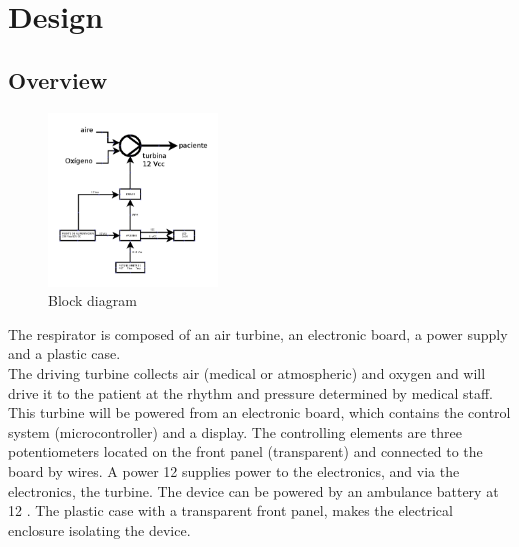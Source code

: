 \section{Design}
\subsection{Overview}
    \begin{figure}[H]
        \centering
        \includegraphics[width=0.4\textwidth]{Img/Bloques.PNG}
        \caption{Block diagram}
    \end{figure}
    The respirator is composed of an air turbine, an electronic board, a power supply and a plastic case.\\
    
    The driving turbine collects air (medical or atmospheric) and oxygen and will drive it to the patient at the rhythm and pressure determined by medical staff. This turbine will be powered from an electronic board, which contains the control system (microcontroller) and a display. The controlling elements are three potentiometers located on the front panel (transparent) and connected to the board by wires. A power 12 \Vcc supplies power to the electronics, and via the electronics, the turbine. The device can be powered by an ambulance battery at 12 \Vcc. The plastic case with a transparent front panel, makes the electrical enclosure isolating the device.
    
    
